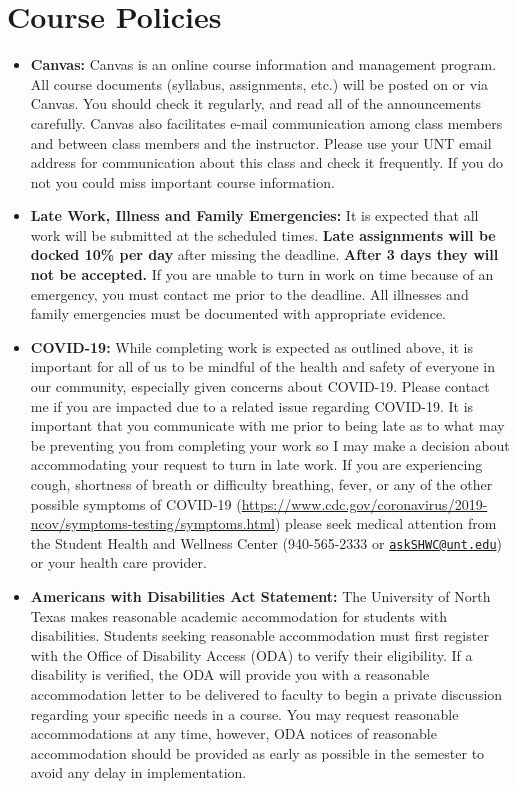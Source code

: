 \documentclass[12pt,]{article}
\begin{document}
\hypertarget{course-policies}{%
\section{Course Policies}\label{course-policies}}

\begin{itemize}
\item
  \textbf{Canvas:} Canvas is an online course information and management
  program. All course documents (syllabus, assignments, etc.) will be
  posted on or via Canvas. You should check it regularly, and read all
  of the announcements carefully. Canvas also facilitates e-mail
  communication among class members and between class members and the
  instructor. Please use your UNT email address for communication about
  this class and check it frequently. If you do not you could miss
  important course information.
\item
  \textbf{Late Work, Illness and Family Emergencies:} It is expected
  that all work will be submitted at the scheduled times. \textbf{Late
  assignments will be docked 10\% per day} after missing the deadline.
  \textbf{After 3 days they will not be accepted.} If you are unable to
  turn in work on time because of an emergency, you must contact me
  prior to the deadline. All illnesses and family emergencies must be
  documented with appropriate evidence.
\item
  \textbf{COVID-19:} While completing work is expected as outlined
  above, it is important for all of us to be mindful of the health and
  safety of everyone in our community, especially given concerns about
  COVID-19. Please contact me if you are impacted due to a related issue
  regarding COVID-19. It is important that you communicate with me prior
  to being late as to what may be preventing you from completing your
  work so I may make a decision about accommodating your request to turn
  in late work. If you are experiencing cough, shortness of breath or
  difficulty breathing, fever, or any of the other possible symptoms of
  COVID-19
  (\url{https://www.cdc.gov/coronavirus/2019-ncov/symptoms-testing/symptoms.html})
  please seek medical attention from the Student Health and Wellness
  Center (940-565-2333 or
  \href{mailto:askSHWC@unt.edu}{\nolinkurl{askSHWC@unt.edu}}) or your
  health care provider.
\item
  \textbf{Americans with Disabilities Act Statement:} The University of
  North Texas makes reasonable academic accommodation for students with
  disabilities. Students seeking reasonable accommodation must first
  register with the Office of Disability Access (ODA) to verify their
  eligibility. If a disability is verified, the ODA will provide you
  with a reasonable accommodation letter to be delivered to faculty to
  begin a private discussion regarding your specific needs in a course.
  You may request reasonable accommodations at any time, however, ODA
  notices of reasonable accommodation should be provided as early as
  possible in the semester to avoid any delay in implementation.
\end{itemize}
\end{document}
